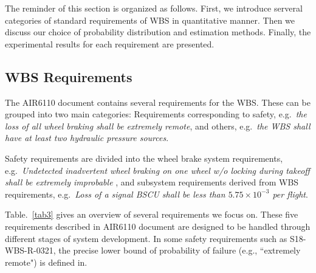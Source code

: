 The reminder of this section is organized as follows. First, we introduce serveral categories of standard requirements of WBS in quantitative manner. Then we discuss our choice of probability distribution and estimation methods. Finally, the experimental results for each requirement are presented.

\subsection{WBS Requirements}
The AIR6110 document contains several requirements for the WBS. These can be grouped into two main categories: Requirements corresponding to safety, e.g.\ \emph{the loss of all wheel braking shall be extremely remote}, and others, e.g.\ \emph{the WBS shall have at least two hydraulic pressure sources}.

Safety requirements are divided into the wheel brake system requirements, e.g.\ \emph{Undetected inadvertent wheel braking on one wheel w/o locking during takeoff shall be extremely improbable
}, and subsystem requirements derived from WBS requirements, e.g.\ \emph{Loss of a signal BSCU shall be less than $5.75\times10^{-3}$ per flight}.

Table.~\ref{tab3} gives an overview of several requirements we focus on. These five requirements described in AIR6110 document are designed to be handled through different stages of system development. In some safety requirements such as S18-WBS-R-0321, the precise lower bound of probability of failure (e.g., ``extremely remote") is defined in\cite{ac}.


